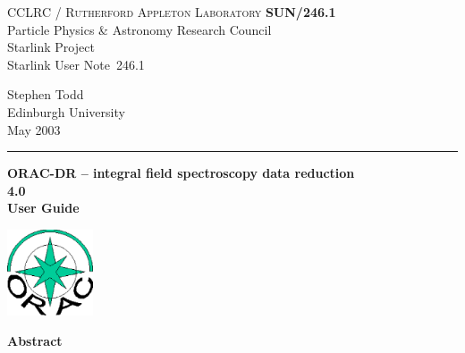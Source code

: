 \documentclass[twoside,11pt]{article}
\newcommand{\stardoccategory}  {Starlink User Note}
\newcommand{\stardocinitials}  {SUN}
\newcommand{\stardocnumber}    {246.1}
\newcommand{\stardocauthors}   {Stephen Todd \\
                                Edinburgh University}
\newcommand{\stardocdate}      {May 2003}
\newcommand{\stardoctitle}     {ORAC-DR -- integral field spectroscopy
  data reduction}
\newcommand{\stardocversion}   {4.0}
\newcommand{\stardocmanual}    {User Guide}
\newcommand{\stardocname}{\stardocinitials /\stardocnumber}
\newenvironment{latexonly}{}{}
\renewcommand{\_}{\texttt{\symbol{95}}}
\begin{document}
\setcounter{secnumdepth}{5}
\thispagestyle{empty}

\begin{latexonly}
   CCLRC / \textsc{Rutherford Appleton Laboratory} \hfill \textbf{\stardocname}\\
   {\large Particle Physics \& Astronomy Research Council}\\
   {\large Starlink Project\\ }
   {\large \stardoccategory\ \stardocnumber}
   \begin{flushright}
   \stardocauthors\\
   \stardocdate
   \end{flushright}
   \vspace{-4mm}
   \rule{\textwidth}{0.5mm}
   \vspace{5mm}
   \begin{center}
   {\Huge\textbf{\stardoctitle \\ [2.5ex]}}
   {\LARGE\textbf{\stardocversion \\ [4ex]}}
   {\Huge\textbf{\stardocmanual}}
   \end{center}
   \vspace{5mm}

\begin{center}
\includegraphics[width=1.0in]{orac_logo.eps}
\end{center}

   \vspace{10mm}
   \begin{center}
      {\Large\textbf{Abstract}}
   \end{center}
\end{latexonly}
\end{document}
